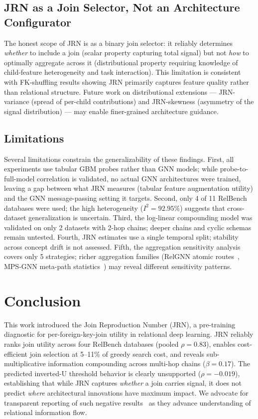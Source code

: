\documentclass[11pt,letterpaper]{article}
\begin{document}
\subsection{JRN as a Join Selector, Not an Architecture Configurator}

The honest scope of JRN is as a binary join selector: it reliably determines \emph{whether} to include a join (scalar property capturing total signal) but not \emph{how} to optimally aggregate across it (distributional property requiring knowledge of child-feature heterogeneity and task interaction). This limitation is consistent with FK-shuffling results showing JRN primarily captures feature quality rather than relational structure. Future work on distributional extensions --- JRN-variance (spread of per-child contributions) and JRN-skewness (asymmetry of the signal distribution) --- may enable finer-grained architecture guidance.

\subsection{Limitations}

Several limitations constrain the generalizability of these findings. First, all experiments use tabular GBM probes rather than GNN models; while probe-to-full-model correlation is validated, no actual GNN architectures were trained, leaving a gap between what JRN measures (tabular feature augmentation utility) and the GNN message-passing setting it targets. Second, only 4 of 11 RelBench databases were used; the high heterogeneity ($I^2 = 92.95\%$) suggests that cross-dataset generalization is uncertain. Third, the log-linear compounding model was validated on only 2 datasets with 2-hop chains; deeper chains and cyclic schemas remain untested. Fourth, JRN estimates use a single temporal split; stability across concept drift is not assessed. Fifth, the aggregation sensitivity analysis covers only 5 strategies; richer aggregation families (RelGNN atomic routes~\citep{Chen2025}, MPS-GNN meta-path statistics~\citep{Ferrini2024b}) may reveal different sensitivity patterns.

\section{Conclusion}
\label{sec:conclusion}

This work introduced the Join Reproduction Number (JRN), a pre-training diagnostic for per-foreign-key-join utility in relational deep learning. JRN reliably ranks join utility across four RelBench databases (pooled $\rho = 0.83$), enables cost-efficient join selection at 5--11\% of greedy search cost, and reveals sub-multiplicative information compounding across multi-hop chains ($\beta = 0.17$). The predicted inverted-U threshold behavior is clearly unsupported ($\rho = -0.019$), establishing that while JRN captures \emph{whether} a join carries signal, it does not predict \emph{where} architectural innovations have maximum impact. We advocate for transparent reporting of such negative results~\citep{Karl2024} as they advance understanding of relational information flow.
\end{document}

